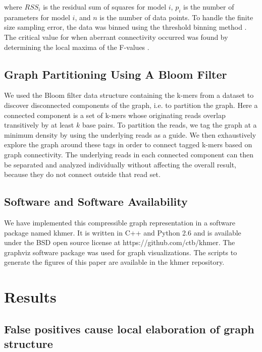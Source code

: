 \documentclass[12pt]{article} \usepackage{simplemargins}
\begin{document}
where $RSS_i$ is the residual sum of squares for model $i$, $p_i$ is 
the number of parameters for model $i$, and $n$ is the number of data 
points. To handle the finite size sampling error, the data was binned using the 
threshold binning method \cite{adami2002critical}. The critical value for 
when aberrant connectivity occurred was found by determining the local maxima 
of the F-values \cite{wald43}.

\subsection{Graph Partitioning Using A Bloom Filter}
We used the Bloom filter data structure containing the k-mers from a
dataset to discover disconnected components of the graph, i.e. to
partition the graph.  Here a connected component is a set of k-mers
whose originating reads overlap transitively by at least $k$ base
pairs.  To partition the reads, we tag the graph at a minimum density
by using the underlying reads as a guide. We then exhaustively explore
the graph around these tags in order to connect tagged k-mers based on
graph connectivity.  The underlying reads in each connected component
can then be separated and analyzed individually without affecting the
overall result, because they do not connect outside that read set.


\subsection{Software and Software Availability}

We have implemented this compressible graph representation in a
software package named khmer.  It is written in C++ and Python 2.6 and
is available under the BSD open source license at
https://github.com/ctb/khmer.  The graphviz software package was used
for graph visualizations. The scripts to generate the figures of this
paper are available in the khmer repository.

\section{Results}

\subsection{False positives cause local elaboration of graph structure}
\end{document}
